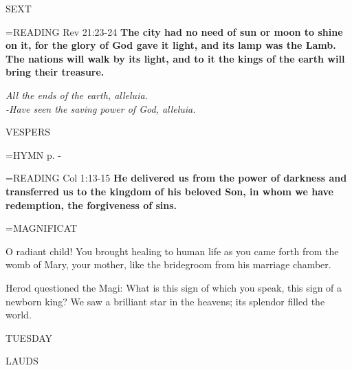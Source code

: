 \begin{flushleft}\normalsize SEXT\\\end{flushleft}

\hangindent=\parindent \small{READING}    Rev 21:23-24 \textbf{   The city had no need of sun or moon to shine on it, for the glory of God gave it light, and its lamp was the Lamb. The nations will walk by its light, and to it the kings of the earth will bring their treasure.}

\begin{center}
\textit{All the ends of the earth, alleluia.\\
-Have seen the saving power of God, alleluia.}
\end{center}

\begin{flushleft}\normalsize VESPERS\\\end{flushleft}

\hangindent=\parindent \small{\uppercase{HYMN} p.  \pageref{christmas:firstHymn} - \pageref{christmas:lastHymn}\\}

\hangindent=\parindent \small{READING}    Col 1:13-15 \textbf{   He delivered us from the power of darkness and transferred us to the kingdom of his beloved Son, in whom we have redemption, the forgiveness of sins.\\}

\hangindent=\parindent \small MAGNIFICAT
\begin{description}[labelindent=\parindent, noitemsep, leftmargin=*]
\item [(before the Epiphany):]  O radiant child! You brought healing to human life as you came forth from the womb of Mary, your mother, like the bridegroom from his marriage chamber.
\item [(Wednesday after the Epiphany):]  Herod questioned the Magi: What is this sign of which you speak, this sign of a newborn king? We saw a brilliant star in the heavens; its splendor filled the world.
\end{description}


\begin{center}
\normalsize TUESDAY
\end{center}

\begin{flushleft}\normalsize LAUDS\\\end{flushleft}

